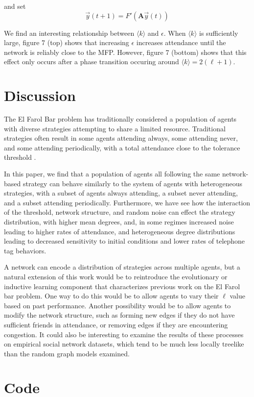 \documentclass[12pt]{article}
\begin{document}
and set
\begin{equation}
  \vec{y}(t + 1) = F'(\mathbf{A}\vec{y}(t))
\end{equation}

We find an interesting relationship between $\langle k \rangle$ and $\epsilon$.  When $\langle k \rangle$ is sufficiently large, figure 7 (top) shows that increasing $\epsilon$ increases attendance until the network is reliably close to the MFP.  However, figure 7 (bottom) shows that this effect only occurs after a phase transition occuring around $\langle k \rangle = 2 (\ell + 1)$.

\section{Discussion}

The El Farol Bar problem has traditionally considered a population of agents with diverse strategies attempting to share a limited resource.  Traditional strategies often result in some agents attending always, some attending never, and some attending periodically, with a total attendance close to the tolerance threshold\cite{arthur:1994} \cite{stLuce:2020}.

In this paper, we find that a population of agents all following the same network-based strategy can behave similarly to the system of agents with heterogeneous strategies, with a subset of agents always attending, a subset never attending, and a subset attending periodically.  Furthermore, we have see how the interaction of the threshold, network structure, and random noise can effect the strategy distribution, with higher mean degrees, and, in some regimes increased noise leading to higher rates of attendance, and heterogeneous degree distributions leading to decreased sensitivity to initial conditions and lower rates of telephone tag behaviors.

A network can encode a distribution of strategies across multiple agents, but a natural extension of this work would be to reintroduce the evolutionary or inductive learning component that characterizes previous work on the El Farol bar problem.  One way to do this would be to allow agents to vary their $\ell$ value based on past performance.  Another possibility would be to allow agents to modify the network structure, such as forming new edges if they do not have sufficient friends in attendance, or removing edges if they are encountering congestion.  It could also be interesting to examine the results of these processes on empirical social network datasets, which tend to be much less locally treelike than the random graph models examined.    

\section*{Code}
\end{document}
